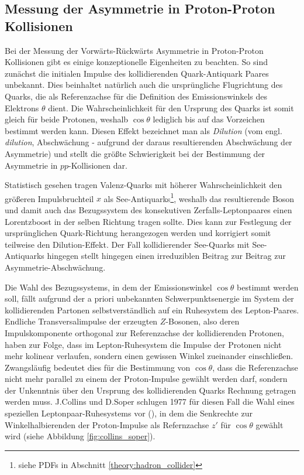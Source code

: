 \subsection{Messung der Asymmetrie in Proton-Proton Kollisionen}
\label{theory:afb_hadron_collider}

Bei der Messung der Vorwärts-Rückwärts Asymmetrie in Proton-Proton Kollisionen
gibt es einige konzeptionelle Eigenheiten zu beachten. So sind zunächst die
initialen Impulse des kollidierenden Quark-Antiquark Paares unbekannt. Dies
beinhaltet natürlich auch die ursprüngliche Flugrichtung des Quarks, die als
Referenzachse für die Definition des Emissionswinkels des Elektrons $\theta$
dient. Die Wahrscheinlichkeit für den Ursprung des Quarks ist somit gleich für
beide Protonen, weshalb $\cos\theta$ lediglich bis auf das Vorzeichen bestimmt
werden kann. Diesen Effekt bezeichnet man als \textit{Dilution} (vom engl.
\textit{dilution}, Abschwächung - aufgrund der daraus resultierenden
Abschwächung der Asymmetrie) und stellt die größte Schwierigkeit bei der
Bestimmung der Asymmetrie in $pp$-Kollisionen dar.

Statistisch gesehen tragen Valenz-Quarks mit höherer Wahrscheinlichkeit den
größeren Impulsbruchteil $x$ als See-Antiquarks\footnote{siehe \acl{PDF}s in
Abschnitt \ref{theory:hadron_collider}}, weshalb das resultierende Boson und
damit auch das Bezugssystem des konsekutiven Zerfalls-Leptonpaares einen
Lorentzboost in der selben Richtung tragen sollte. Dies kann zur Festlegung der
ursprünglichen Quark-Richtung herangezogen werden und korrigiert somit
teilweise den Dilution-Effekt. Der Fall kollidierender See-Quarks mit
See-Antiquarks hingegen stellt hingegen einen irreduziblen Beitrag zur Beitrag
zur Asymmetrie-Abschwächung.

Die Wahl des Bezugssystems, in dem der Emissionswinkel $\cos\theta$ bestimmt
werden soll, fällt aufgrund der a priori unbekannten Schwerpunktsenergie im
System der kollidierenden Partonen selbstverständlich auf ein Ruhesystem des
Lepton-Paares. Endliche Transversalimpulse der erzeugten $Z$-Bosonen, also
deren Impulskomponente orthogonal zur Referenzachse der kollidierenden
Protonen, haben zur Folge, dass im Lepton-Ruhesystem die Impulse der Protonen
nicht mehr kolinear verlaufen, sondern einen gewissen Winkel zueinander
einschließen. Zwangsläufig bedeutet dies für die Bestimmung von $\cos\theta$,
dass die Referenzachse nicht mehr parallel zu einem der Proton-Impulse gewählt
werden darf, sondern der Unkenntnis über den Ursprung des kollidierenden Quarks
Rechnung getragen werden muss. J.Collins und D.Soper schlugen 1977 für diesen
Fall die Wahl eines speziellen Leptonpaar-Ruhesystems vor
(\cite{Collins:1977iv}), in dem die Senkrechte zur Winkelhalbierenden der
Proton-Impulse als Refernzachse $z'$ für $\cos\theta$ gewählt wird (siehe
Abbildung \ref{fig:collins_soper}).

